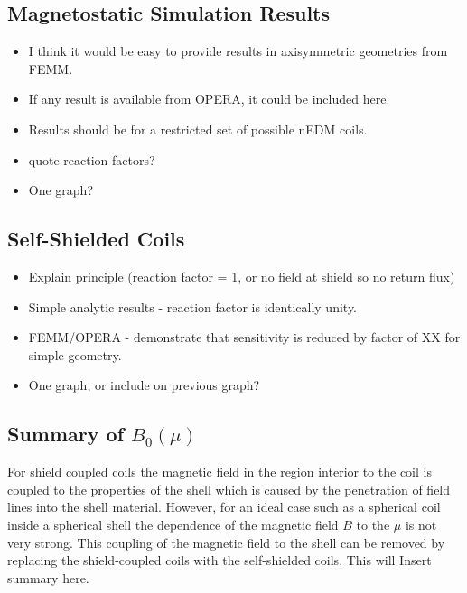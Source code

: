 \documentclass[review]{elsarticle}
\begin{document}
\subsection{Magnetostatic Simulation Results}

\begin{itemize}
\item I think it would be easy to provide results in axisymmetric
  geometries from FEMM.
\item If any result is available from OPERA, it could be included here.
\item Results should be for a restricted set of possible nEDM coils.
\item quote reaction factors?
\item One graph?  %
\end{itemize}

\subsection{Self-Shielded Coils}

\begin{itemize}
\item Explain principle (reaction factor = 1, or no field at shield so
  no return flux)
\item Simple analytic results - reaction factor is identically unity.
\item FEMM/OPERA - demonstrate that sensitivity is reduced by factor
  of XX for simple geometry.
\item One graph, or include on previous graph?
\end{itemize}

\subsection{Summary of $B_0(\mu)$}
For shield coupled coils the magnetic field in the region interior to the coil is coupled to the properties of the shell which is caused by the penetration of field lines into the shell material. However, for an ideal case such as a spherical coil inside a spherical shell the dependence of the magnetic field $B$ to the $\mu$ is not very strong. This coupling of the magnetic field to the shell can be removed by replacing the shield-coupled coils with the self-shielded coils. This will
Insert summary here.
\end{document}
